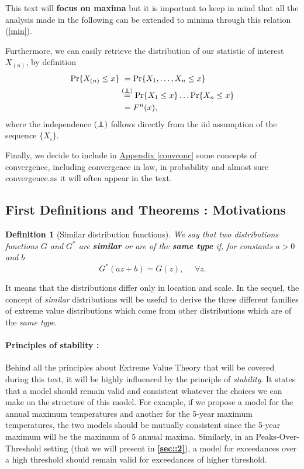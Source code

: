\documentclass[11pt,a4paper,openany ]{book}
\newcommand\independent{\protect\mathpalette{\protect\independenT}{\perp}}
\def\independenT#1#2{\mathrel{\rlap{$#1#2$}\mkern2mu{#1#2}}}
\newtheorem{definition}{Definition}[chapter]
\begin{document}
This text will \textbf{focus on maxima} but it is important to keep in mind that all the analysis made in the following can be extended to minima through this relation (\ref{min}).

Furthermore, we can easily retrieve the distribution of our statistic of interest $X_{(n)}$, by definition
\begin{equation}\label{maxdist}
\begin{aligned}
\text{Pr}\{X_{(n)}\leq x\} & \ =\text{Pr}\{X_1,\dots,X_n\leq x\} \\ &\stackrel{(\independent)}{=}\text{Pr}\{X_1\leq x\}\dots\text{Pr}\{X_n\leq x\} \\
&\ =F^n(x),
\end{aligned}
\end{equation}
where the independence $(\independent)$  follows directly from the iid assumption of the sequence $\{X_i\}$.


Finally, we decide to include in \hyperref[convconc]{Appendix \ref{convconc}} some concepts of convergence, including convergence in law, in probability and almost sure convergence.as it will often 
appear in the text.


\subsection*{First Definitions and Theorems : Motivations}
\theoremstyle{definition}
\begin{definition}[Similar distribution functions]\label{similardf} We say that two distributions functions $G$ and $G^*$ are \emph{\textbf{similar}} or are of the \emph{\textbf{same type}}
	if, for constants $a>0$ and $b$
	\begin{equation}\label{simm}
	G^*(az+b)=G(z), \ \ \ \ \ \ \forall z.
	\end{equation}
\end{definition}
It means that the distributions differ only in location and scale. 
In the sequel, the concept of \emph{similar} distributions will be useful to derive the three different families of extreme value distributions which come from other distributions which are of the \emph{same type}.


\paragraph*{Principles of stability :}
Behind all the principles about Extreme Value Theory that will be covered during this text, it will be highly influenced by the principle of \emph{stability}. It states that a model should remain valid and consistent whatever the choices we can make on the structure of this model.
For example, if we propose a model for the annual maximum temperatures and another for the 5-year maximum temperatures, the two models should be mutually consistent since the 5-year maximum will be the maximum of 5 annual maxima. Similarly, in an Peaks-Over-Threshold setting (that we will present in \hyperref[sec::2]{\textbf{\ref{sec::2}}}), a model for exceedances over a high threshold should remain valid for exceedances of higher threshold. 
\end{document}
